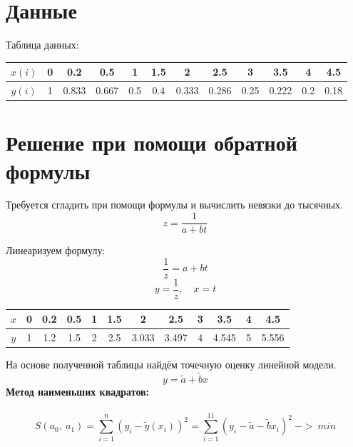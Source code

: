 \documentclass{article}
\begin{document}
\section*{Данные }
Таблица данных:

\begin{table}[H]
    \centering
    \begin{tabular}{|c|c|c|c|c|c|c|c|c|c|c|c|}
    \hline
    $x(i)$& 0& 0.2& 0.5&1& 1.5&  2&  2.5&  3&  3.5 & 4&  4.5\\
    \hline
    $y(i)$&1& 0.833& 0.667& 0.5& 0.4& 0.333& 0.286& 0.25& 0.222& 0.2& 0.18\\
    \hline
    \end{tabular}
\end{table}

\section*{Решение при помощи обратной формулы}
Требуется сгладить при помощи формулы и вычислить невязки до тысячных.
\[ z = \frac{1}{a + bt} \]

Линеаризуем формулу:
\[
\frac{1}{z} = a + bt
\]
\[
y = \frac{1}{z}, \quad x = t
\]
\begin{table}[H]
    \centering
    \begin{tabular}{|c|*{11}{c|}}
        \hline
        \(x\) & 0 & 0.2 & 0.5 & 1 & 1.5 & 2 & 2.5 & 3 & 3.5 & 4 & 4.5 \\
        \hline
        \(y\) & 1 & 1.2 & 1.5 & 2 & 2.5& 3.033 & 3.497 & 4 & 4.545 & 5 & 5.556 \\
        \hline
    \end{tabular}
\end{table}
На основе полученной таблицы найдём точечную оценку линейной модели.
\[
y = \tilde{a} + \tilde{b} x
\]
\textbf{Метод наименьших квадратов:}
\\ \\
\[S(a_0,\ a_1) = \sum_{i=1}^{n}(y_i - \tilde{y}(x_i))^2 = \sum_{i=1}^{11}(y_i - \tilde{a} - \tilde{b}x_i)^2\ ->\ min\]
\end{document}
